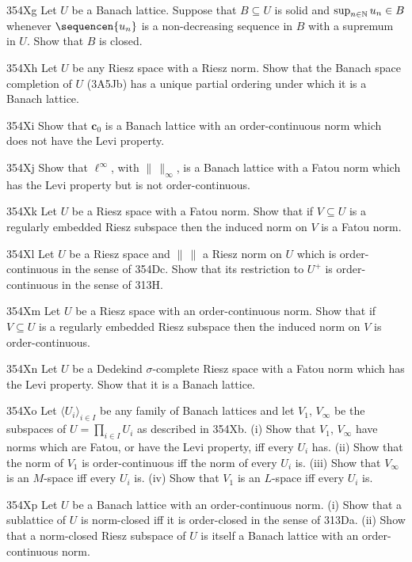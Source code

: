 {\spheader 354Xg Let $U$ be a Banach lattice.   Suppose that
$B\subseteq U$ is solid and $\sup_{n\in\Bbb N}u_n\in B$ whenever $\sequencen{u_n}$
is a non-decreasing sequence in $B$ with a supremum in $U$.   Show that
$B$ is closed.   

\spheader 354Xh Let $U$ be any Riesz space with a Riesz norm.   Show
that the Banach space completion of $U$ (3A5Jb) has a unique
partial ordering under which it is a Banach lattice.

\sqheader 354Xi Show that $\pmb{c}_0$ is a Banach lattice with an
order-continuous norm which does not have the Levi property.

\sqheader 354Xj Show that $\ell^{\infty}$, with $\|\,\|_{\infty}$, is a
Banach lattice with a Fatou norm which has the Levi property but is not
order-continuous.

\spheader 354Xk Let $U$ be a Riesz space with a Fatou norm.   Show that
if $V\subseteq U$ is a regularly embedded Riesz subspace then the induced norm on $V$ is a Fatou norm.

\spheader 354Xl Let $U$ be a Riesz space and $\|\,\|$ a Riesz norm on
$U$ which is order-continuous in the sense of 354Dc.   Show that its
restriction to $U^+$ is order-continuous in the sense of 313H.

\spheader 354Xm Let $U$ be a Riesz space with an order-continuous norm.
Show that if $V\subseteq U$ is a regularly embedded Riesz subspace then
the induced norm on $V$ is order-continuous.

\spheader 354Xn Let $U$ be a Dedekind $\sigma$-complete Riesz space with
a Fatou norm which has the Levi property.   Show that it is a Banach
lattice.   

\spheader 354Xo Let $\langle U_i\rangle_{i\in I}$ be any family of
Banach lattices and let $V_1$, $V_{\infty}$ be the subspaces of
$U=\prod_{i\in I}U_i$ as described in 354Xb.   (i) Show that $V_1$,
$V_{\infty}$ have norms which are Fatou, or have the Levi property,
iff every $U_i$ has.   (ii) Show that the norm of $V_1$ is order-continuous
iff the norm of every $U_i$ is.    (iii) Show that $V_{\infty}$ is an
$M$-space iff every $U_i$ is.   (iv) Show that $V_1$ is an $L$-space iff
every $U_i$ is.

\spheader 354Xp Let $U$ be a Banach lattice with an order-continuous
norm.   (i) Show that a sublattice of
$U$ is norm-closed iff it is order-closed in the sense of 313Da.   (ii) Show
that a norm-closed Riesz subspace of $U$
is itself a Banach lattice with an order-continuous norm.

}
